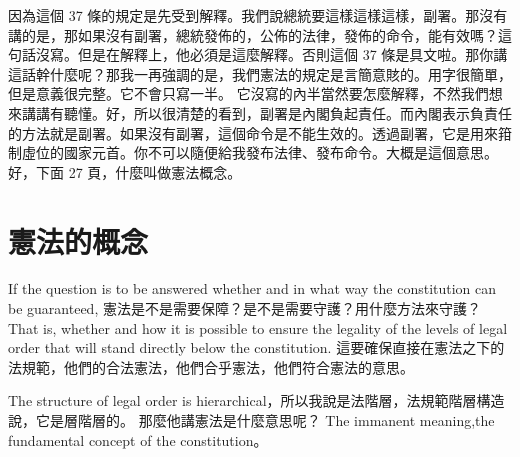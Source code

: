 \hypertarget{w05:cue:90}{}因為這個 37 條的規定是先受到解釋。我們說總統要這樣這樣這樣，副署。那沒有講的是，那如果沒有副署，總統發佈的，公佈的法律，發佈的命令，能有效嗎？這句話沒寫。但是在解釋上，他必須是這麼解釋。否則這個 37 條是具文啦。那你講這話幹什麼呢？那我一再強調的是，我們憲法的規定是言簡意賅的。用字很簡單，但是意義很完整。它不會只寫一半。
\hypertarget{w05:cue:91}{}它沒寫的內半當然要怎麼解釋，不然我們想來講講有聽懂。好，所以很清楚的看到，副署是內閣負起責任。而內閣表示負責任的方法就是副署。如果沒有副署，這個命令是不能生效的。透過副署，它是用來箝制虛位的國家元首。你不可以隨便給我發布法律、發布命令。大概是這個意思。好，下面 27 頁，什麼叫做憲法概念。

\section{憲法的概念}

\hypertarget{w05:cue:92}{}If the question is to be answered whether and in what way the constitution can be guaranteed,
\hypertarget{w05:cue:93}{}憲法是不是需要保障？是不是需要守護？用什麼方法來守護？
\hypertarget{w05:cue:94}{}That is, whether and how it is possible to ensure the legality of the levels of legal order
\hypertarget{w05:cue:95}{}that will stand directly below the constitution.
\hypertarget{w05:cue:96}{}這要確保直接在憲法之下的法規範，他們的合法憲法，他們合乎憲法，他們符合憲法的意思。

\hypertarget{w05:cue:97}{}The structure of legal order is hierarchical，所以我說是法階層，法規範階層構造說，它是層階層的。
\hypertarget{w05:cue:98}{}那麼他講憲法是什麼意思呢？
\hypertarget{w05:cue:99}{}The immanent meaning,the fundamental concept of the constitution。

